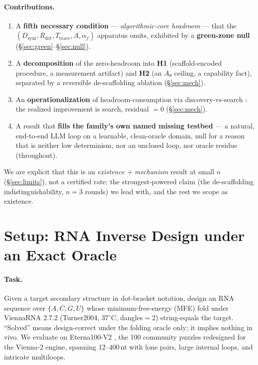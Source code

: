 \documentclass[11pt]{article}
\newcommand{\Dsym}{D_{\mathrm{sym}}}
\newcommand{\Rdet}{R_{\mathrm{det}}}
\newcommand{\Ttrace}{T_{\mathrm{trace}}}
\newcommand{\Ath}{A_{\theta}}
\newcommand{\af}{\alpha_f}
\begin{document}
\paragraph{Contributions.}
\begin{enumerate}[leftmargin=1.4em,itemsep=1pt,topsep=2pt]
\item A \textbf{fifth necessary condition} --- \emph{algorithmic-core headroom} --- that the
  $(\Dsym,\Rdet,\Ttrace,A,\af)$ apparatus omits, exhibited by a \textbf{green-zone null}
  (\S\ref{sec:green}--\S\ref{sec:null}).
\item A \textbf{decomposition} of the zero-headroom into \textbf{H1} (scaffold-encoded procedure, a
  measurement artifact) and \textbf{H2} (an $\Ath$ ceiling, a capability fact), separated by a reversible
  de-scaffolding ablation (\S\ref{sec:mech}).
\item An \textbf{operationalization} of headroom-consumption via discovery-vs-search
  \citep{wangbuehler2026}: the realized improvement is search, residual $=0$ (\S\ref{sec:mech}).
\item A result that \textbf{fills the family's own named missing testbed} --- a natural, end-to-end LLM
  loop on a learnable, clean-oracle domain, null for a reason that is neither low determinism, nor an
  unclosed loop, nor oracle residue (throughout).
\end{enumerate}
We are explicit that this is an \emph{existence + mechanism} result at small $n$ (\S\ref{sec:limits}),
not a certified rate; the strongest-powered claim (the de-scaffolding indistinguishability, $n\!=\!3$
rounds) we lead with, and the rest we scope as existence.

\section{Setup: RNA Inverse Design under an Exact Oracle}\label{sec:setup}
\paragraph{Task.} Given a target secondary structure in dot-bracket notation, design an RNA sequence
over $\{A,C,G,U\}$ whose minimum-free-energy (MFE) fold under ViennaRNA 2.7.2
\citep{lorenz2011viennarna} (Turner2004, $37^\circ$C, dangles$=$2) string-equals the target. ``Solved''
means design-correct under the folding oracle only; it implies nothing in vivo. We evaluate on
Eterna100-V2 \citep{andersonlee2016eterna,eterna100v2}, the 100 community puzzles redesigned for the
Vienna-2 engine, spanning $12$--$400$\,nt with lone pairs, large internal loops, and intricate
multiloops.
\end{document}
